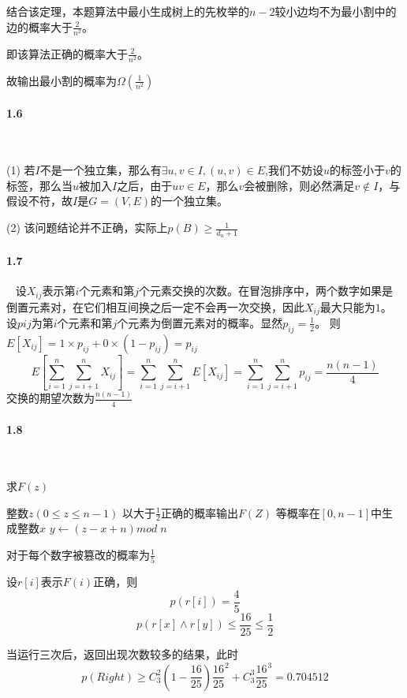结合该定理，本题算法中最小生成树上的先枚举的$n-2$较小边均不为最小割中的边的概率大于$\frac{2}{n^2}$。

即该算法正确的概率大于$\frac{2}{n^2}$。

故输出最小割的概率为$\Omega(\frac{1}{n^2})$

\paragraph{1.6}~{}

(1)
若$I$不是一个独立集，那么有$\exists u,v\in I,(u,v)\in E$,我们不妨设$u$的标签小于$v$的标签，那么当$u$被加入$I$之后，由于$uv \in E$，那么$v$会被删除，则必然满足$v \notin I$，与假设不符，故$I$是$G=(V,E)$的一个独立集。

(2)
该问题结论并不正确，实际上$p(B)\ge \frac{1}{d_u+1}$


\paragraph{1.7}~{}
设$X_{ij}$表示第$i$个元素和第$j$个元素交换的次数。在冒泡排序中，两个数字如果是倒置元素对，在它们相互间换之后一定不会再一次交换，因此$X_{ij}$最大只能为$1$。
设$p{ij}$为第$i$个元素和第$j$个元素为倒置元素对的概率。显然$p_{ij}=\frac{1}{2}$。
则$E[X_{ij}]=1 \times p_{ij}+0 \times (1-p_{ij}) = p_{ij}$
$$E[\sum_{i=1}^{n}\sum_{j=i+1}^{n}X_{ij}] = \sum_{i=1}^{n}\sum_{j=i+1}^{n}E[X_{ij}] = \sum_{i=1}^{n}\sum_{j=i+1}^{n}p_{ij}=\frac{n(n-1)}{4}$$
交换的期望次数为$\frac{n(n-1)}{4}$

\paragraph{1.8}~{}

\begin{algorithm}[H]  
    \caption{求$F(z)$}  
    \begin{algorithmic}[1]
        \Require 整数$z(0 \le z \le n-1)$
        \Ensure 以大于$\frac{1}{2}$正确的概率输出$F(Z)$
        \State 等概率在$[0,n-1]$中生成整数$x$
        \State $y \leftarrow (z-x+n)mod \; n$
    \end{algorithmic}
\end{algorithm}

对于每个数字被篡改的概率为$\frac{1}{5}$

设$r[i]$表示$F(i)$正确，则
$$p(r[i])=\frac{4}{5}$$
$$p(r[x] \land r[y]) \le \frac{16}{25} \le \frac{1}{2}$$

当运行三次后，返回出现次数较多的结果，此时
$$p(Right) \ge C_3^2(1-\frac{16}{25})\frac{16}{25}^2+C_3^3\frac{16}{25}^3=0.704512$$
